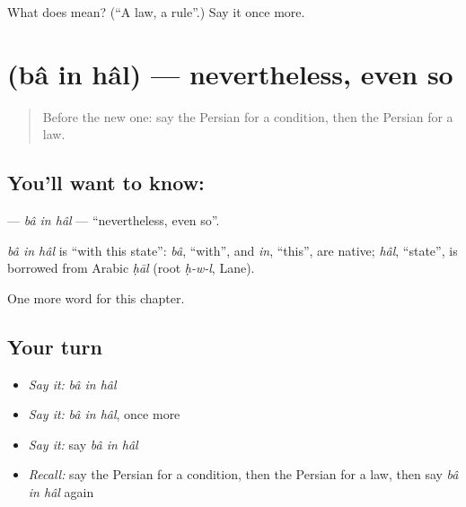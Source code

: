 \begin{tcolorbox}[breakable,colback=teal!4,colframe=teal!35!black,title={Before you move on}]
What does  mean? (\textquotedblleft{}A law, a rule\textquotedblright{}.) Say it once more.
\end{tcolorbox}
\section[\texorpdfstring{\fa{با} \fa{این} \fa{حال} (bâ in hâl)}{با این حال (bâ in hâl)}]{   (bâ in hâl) — nevertheless, even so}

\label{lesson:FA-C197-ba-in-hal}



\begin{quote}
Before the new one: say the Persian for a condition, then the Persian for a law.
\end{quote}

\subsection*{You'll want to know:   }
\textbf{  } — \emph{bâ in hâl} — \textquotedblleft{}nevertheless, even so\textquotedblright{}.

\begin{cousinweb}
\emph{bâ in hâl} is \textquotedblleft{}with this state\textquotedblright{}: \emph{bâ}, \textquotedblleft{}with\textquotedblright{}, and \emph{in}, \textquotedblleft{}this\textquotedblright{}, are native; \emph{hâl}, \textquotedblleft{}state\textquotedblright{}, is borrowed from Arabic \emph{ḥāl} (root \emph{ḥ-w-l}, Lane).
\end{cousinweb}

\begin{grammarlens}[title={What you've built}]
One more word for this chapter.
\end{grammarlens}

\subsection*{Your turn}
\begin{itemize}
\raggedright
  \item \emph{Say it:} \emph{bâ in hâl}
  \item \emph{Say it:} \emph{bâ in hâl}, once more
  \item \emph{Say it:} say \emph{bâ in hâl}
  \item \emph{Recall:} say the Persian for a condition, then the Persian for a law, then say \emph{bâ in hâl} again
\end{itemize}

